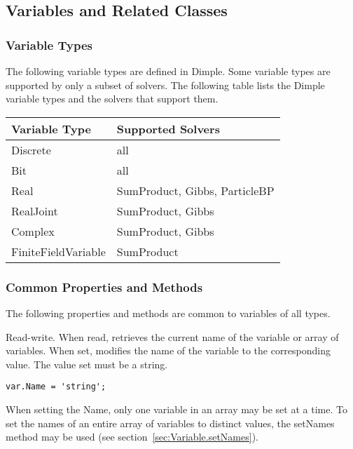 \subsection{Variables and Related Classes}

\subsubsection{Variable Types}

The following variable types are defined in Dimple.  Some variable types are supported by only a subset of solvers.  The following table lists the Dimple variable types and the solvers that support them.

\begin{longtable} {l | p{5cm}}
Variable Type & Supported Solvers \\
\hline
\endhead
Discrete & all \\
Bit & all \\
Real & SumProduct, Gibbs, ParticleBP \\
RealJoint & SumProduct, Gibbs \\ 
Complex & SumProduct, Gibbs \\
FiniteFieldVariable & SumProduct \\
\end{longtable} 

\subsubsection{Common Properties and Methods}

The following properties and methods are common to variables of all types.



Read-write.  When read, retrieves the current name of the variable or array of variables.  When set, modifies the name of the variable to the corresponding value.  The value set must be a string.

\ifmatlab
\begin{lstlisting}
var.Name = 'string';
\end{lstlisting}

When setting the Name, only one variable in an array may be set at a time.  To set the names of an entire array of variables to distinct values, the setNames method may be used (see section~\ref{sec:Variable.setNames}).

\fi

